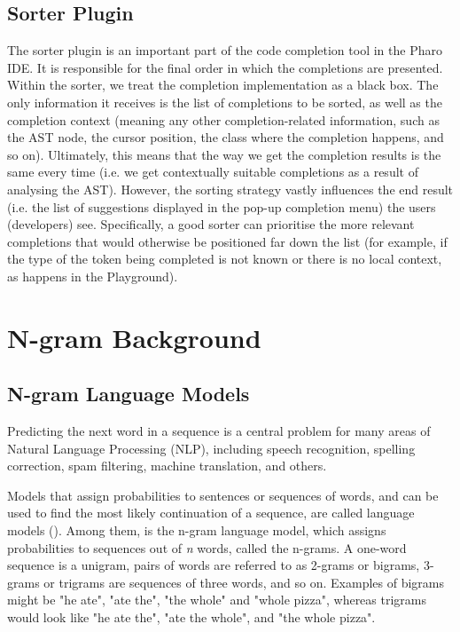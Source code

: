 \documentclass[sigplan,screen]{acmart}
\begin{document}
\subsection{Sorter Plugin}
The sorter plugin is an important part of the code completion tool in the Pharo IDE. It is responsible for the final order in which the completions are presented. Within the sorter, we treat the completion implementation as a black box. The only information it receives is the list of completions to be sorted, as well as the completion context (meaning any other completion-related information, such as the AST node, the cursor position, the class where the completion happens, and so on). Ultimately, this means that the way we get the completion results is the same every time (i.e. we get contextually suitable completions as a result of analysing the AST). However, the sorting strategy vastly influences the end result (i.e. the list of suggestions displayed in the pop-up completion menu) the users (developers) see. Specifically, a good sorter can prioritise the more relevant completions that would otherwise be positioned far down the list (for example, if the type of the token being completed is not known or there is no local context, as happens in the Playground).

\section{N-gram Background}
\subsection{N-gram Language Models}
Predicting the next word in a sequence is a central problem for many areas of Natural Language Processing (NLP), including speech recognition, spelling correction, spam filtering, machine translation, and others.

Models that assign probabilities to sentences or sequences of words, and can be used to find the most likely continuation of a sequence, are called language models (\cite{Jura09a}). Among them, is the n-gram language model, which assigns probabilities to sequences out of \textit{n} words, called the n-grams. A one-word sequence is a unigram, pairs of words are referred to as 2-grams or bigrams, 3-grams or trigrams are sequences of three words, and so on. Examples of bigrams might be "he ate", "ate the", "the whole" and "whole pizza", whereas trigrams would look like "he ate the", "ate the whole", and "the whole pizza".
\end{document}
